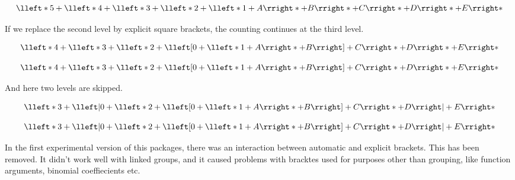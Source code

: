 \documentclass{longmath-doc}
\begin{document}
\begin{exec}\:
  \delimitershortfall -2pt
  $$ \lleft* 5 + \lleft* 4 + \lleft* 3 
   + \lleft* 2 + \lleft* 1 + A \rright* + B \rright* 
   + C \rright* + D \rright* + E \rright* $$
\end{exec}
If we replace the second level by explicit square brackets, the counting continues at the third level.
\begin{code}
  $$ \lleft* 4 + \lleft* 3 + \lleft* 2
   + \lleft[ 0 + \lleft* 1 + A \rright* + B \rright]
   + C \rright* + D \rright* + E \rright* $$
\end{code}
\begin{exec}\:
  \delimitershortfall -2pt
  $$ \lleft* 4 + \lleft* 3 + \lleft* 2
   + \lleft[ 0 + \lleft* 1 + A \rright* + B \rright]
   + C \rright* + D \rright* + E \rright* $$
\end{exec}
And here two levels are skipped.
\begin{code}
  $$ \lleft* 3 + \lleft| 0 + \lleft* 2
   + \lleft[ 0 + \lleft* 1 + A \rright* + B \rright]
   + C \rright* + D \rright| + E \rright* $$
\end{code}
\begin{exec}\:
  \delimitershortfall -2pt
  $$ \lleft* 3 + \lleft| 0 + \lleft* 2
   + \lleft[ 0 + \lleft* 1 + A \rright* + B \rright]
   + C \rright* + D \rright| + E \rright* $$
\end{exec}
In the first experimental version of this packages, there was an interaction between automatic and explicit brackets. This has been removed. It didn't work well with linked groups, and it caused problems with bracktes used for purposes other than grouping, like function arguments, binomial coeffiecients etc.
\end{document}
